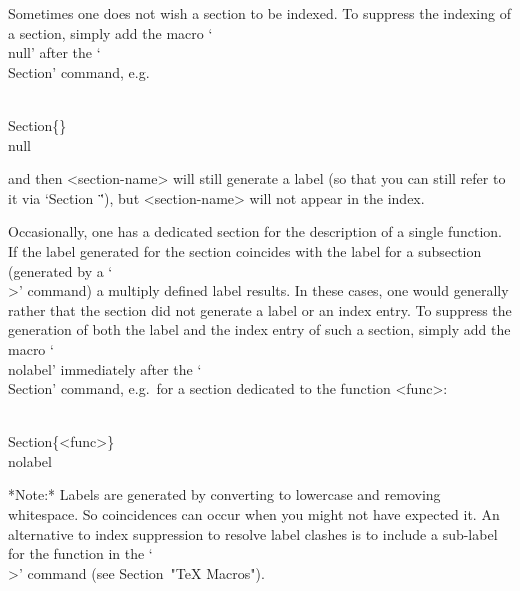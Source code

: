 
Sometimes one does not wish a section to  be  indexed.  To  suppress  the
indexing  of  a  section,  simply  add  the  macro  `\\null'  after   the
`\\Section' command, e.g.

\)\\Section\{<section-name>\}\\null

and then <section-name> will still generate a  label  (so  that  you  can
still refer to it via `Section~\"<section-name>\"'),  but  <section-name>
will not appear in the index.

Occasionally, one has a dedicated section for the description of a single
function. If the label generated for the section coincides with the label
for a subsection (generated by a `\\>' command) a multiply defined  label
results. In these cases, one would generally rather that the section  did
not generate a label or an index entry. To  suppress  the  generation  of
both the label and the index entry of such  a  section,  simply  add  the
macro `\\nolabel' immediately after the `\\Section' command,  e.g.~for  a
section dedicated to the function <func>:

\)\\Section\{<func>\}\\nolabel

*Note:* Labels are generated by  converting  to  lowercase  and  removing
whitespace. So coincidences can occur when you might  not  have  expected
it. An alternative to index suppression to resolve label  clashes  is  to
include  a  sub-label  for  the  function  in  the  `\\>'  command   (see
Section~"TeX Macros").


